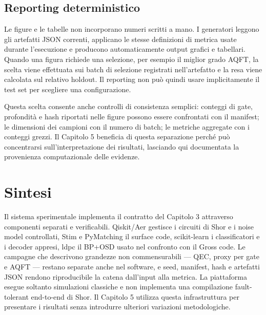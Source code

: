 \subsection{Reporting deterministico}\label{sec:finale_4_8_2}

Le figure e le tabelle non incorporano numeri scritti a mano. I generatori leggono gli artefatti JSON correnti, applicano le stesse definizioni di metrica usate durante l'esecuzione e producono automaticamente output grafici e tabellari. Quando una figura richiede una selezione, per esempio il miglior grado AQFT, la scelta viene effettuata sui batch di selezione registrati nell'artefatto e la resa viene calcolata sul relativo holdout. Il reporting non può quindi usare implicitamente il test set per scegliere una configurazione.

Questa scelta consente anche controlli di consistenza semplici: conteggi di gate, profondità e hash riportati nelle figure possono essere confrontati con il manifest; le dimensioni dei campioni con il numero di batch; le metriche aggregate con i conteggi grezzi. Il Capitolo 5 beneficia di questa separazione perché può concentrarsi sull'interpretazione dei risultati, lasciando qui documentata la provenienza computazionale delle evidenze.

\section{Sintesi}\label{sec:finale_4_9}

Il sistema sperimentale implementa il contratto del Capitolo 3 attraverso componenti separati e verificabili. Qiskit/Aer gestisce i circuiti di Shor e i noise model controllati, Stim e PyMatching il surface code, scikit-learn i classificatori e i decoder appresi, ldpc il BP+OSD usato nel confronto con il Gross code. Le campagne che descrivono grandezze non commensurabili --- QEC, proxy per gate e AQFT --- restano separate anche nel software, e seed, manifest, hash e artefatti JSON rendono riproducibile la catena dall'input alla metrica. La piattaforma esegue soltanto simulazioni classiche e non implementa una compilazione fault-tolerant end-to-end di Shor. Il Capitolo 5 utilizza questa infrastruttura per presentare i risultati senza introdurre ulteriori variazioni metodologiche.
